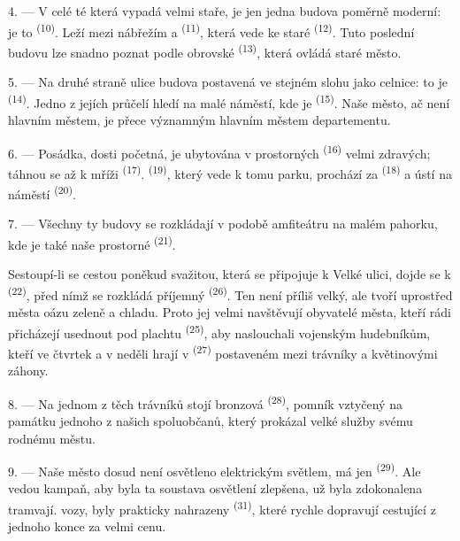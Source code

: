 4. --- V celé té  která vypadá velmi staře, je jen jedna budova poměrně
moderní: je to  \textsuperscript{(10)}. Leží mezi nábřežím a
 \textsuperscript{(11)}, která vede ke staré 
\textsuperscript{(12)}. Tuto poslední budovu lze snadno poznat podle obrovské
 \textsuperscript{(13)}, která ovládá staré město.

5. --- Na druhé straně ulice  budova postavená ve stejném slohu jako celnice: to
je  \textsuperscript{(14)}. Jedno z jejích průčelí hledí na malé náměstí, kde je
 \textsuperscript{(15)}. Naše město, ač není hlavním městem, je přece
významným hlavním městem departementu.

\VUsaut{5.0mm}
\VUsaut{3.4mm}

6. --- Posádka, dosti početná, je ubytována v prostorných 
\textsuperscript{(16)} velmi zdravých; táhnou se až k mříži 
\textsuperscript{(17)}.  \textsuperscript{(19)}, který vede k tomu parku,
prochází za  \textsuperscript{(18)} a ústí na náměstí
 \textsuperscript{(20)}.

7. --- Všechny ty budovy se rozkládají v podobě amfiteátru na malém pahorku, kde je také naše
prostorné  \textsuperscript{(21)}.

Sestoupí-li se cestou poněkud svažitou, která se připojuje k Velké ulici, dojde se k
 \textsuperscript{(22)}, před nímž se rozkládá příjemný  \textsuperscript{(26)}. Ten  není příliš velký, ale tvoří uprostřed města
oázu zeleně a chladu. Proto jej velmi navštěvují obyvatelé města, kteří rádi přicházejí
usednout pod plachtu  \textsuperscript{(25)}, aby naslouchali vojenským
hudebníkům, kteří ve čtvrtek a v neděli hrají v
 \textsuperscript{(27)} postaveném mezi trávníky a květinovými záhony.

8. --- Na jednom z těch trávníků stojí bronzová  \textsuperscript{(28)}, pomník
vztyčený na památku jednoho z našich spoluobčanů, který prokázal velké služby svému rodnému
městu.

\VUsaut{4.0mm}
\VUsaut{3.4mm}

9. --- Naše město dosud není osvětleno elektrickým světlem, má jen 
\textsuperscript{(29)}. Ale  vedou kampaň, aby byla ta soustava
osvětlení zlepšena,  už byla zdokonalena  tramvají.
 vozy,   byly prakticky nahrazeny
 \textsuperscript{(31)}, které rychle dopravují cestující z
jednoho konce  za velmi  cenu.


